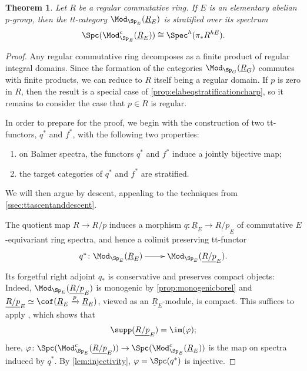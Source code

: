 \documentclass{amsart}%
\numberwithin{equation}{section}%
\newtheorem{Thm}[subsection]{Theorem}
\theoremstyle{remark}
\newcounter{enum-resume-hack}
\begin{document}
\begin{Thm}\label{thm:elabeqstratification}
Let $R$ be a regular commutative ring. If $E$ is an elementary abelian $p$-group, then the tt-category $\Mod_{\Sp_{E}}(\underline{R}_E)$ is stratified over its spectrum
\[
\Spc(\Mod_{\Sp_{E}}^c(\underline{R}_E)) \cong \Spec^h(\pi_*R^{hE}).
\]
\end{Thm}
\begin{proof}
Any regular commutative ring decomposes as a finite product of regular integral domains. Since the formation of the categories $\Mod_{\Sp_G}(\underline{R}_G)$ commutes with finite products, we can reduce to $R$ itself being a regular domain. If $p$ is zero in $R$, then the result is a special case of \cref{prop:elabeqstratificationcharp}, so it remains to consider the case that $p \in R$ is regular.

In order to prepare for the proof, we begin with the construction of two tt-functors, $q^*$ and $f^*$, with the following two properties:
    \begin{enumerate}
        \item on Balmer spectra, the functors $q^*$ and $f^*$ induce a jointly bijective map;
        \item the target categories of $q^*$ and $f^*$ are stratified. 
    \end{enumerate}
We will then argue by descent, appealing to the techniques from \cref{ssec:ttascentanddescent}.    

The quotient map $R \to R/p$ induces a morphism $q\colon \underline{R}_E \to \underline{R/p}_E$ of commutative $E$-equivariant ring spectra, and hence a colimit preserving tt-functor
\[
\xymatrix{q^*\colon\Mod_{\Sp_{E}}(\underline{R}_E) \ar[r] & \Mod_{\Sp_{E}}(\underline{R/p}_E).}
\]
Its forgetful right adjoint $q_*$ is conservative and preserves compact objects: Indeed, $\Mod_{\Sp_{E}}(\underline{R/p}_E)$ is monogenic by \cref{prop:monogenicborel} and $\underline{R/p}_E \simeq \cof(\underline{R}_E \xrightarrow{p} \underline{R}_E)$, viewed as an $\underline{R}_E$-module, is compact. This suffices to apply \cite[Thm.~1.7]{Balmer18}, which shows that 
\begin{equation}\label{eq:suppofRmodp}
    \supp(\underline{R/p}_E) = \im(\varphi);
\end{equation}
here, $\varphi\colon \Spc(\Mod_{\Sp_{E}}^c(\underline{R/p}_E)) \to \Spc(\Mod_{\Sp_{E}}^c(\underline{R}_E))$ is the map on spectra induced by $q^*$. By \cref{lem:injectivity}, $\varphi = \Spc(q^*)$ is injective.


\end{proof}
\end{document}
